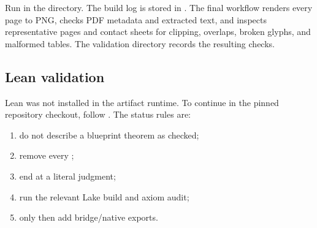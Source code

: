 Run  in the  directory.  The build log is stored
in .  The final workflow renders every page
to PNG, checks PDF metadata and extracted text, and inspects representative
pages and contact sheets for clipping, overlaps, broken glyphs, and malformed
tables.  The validation directory records the resulting checks.

\subsection{Lean validation}

Lean was not installed in the artifact runtime.  To continue in the pinned
repository checkout, follow .  The status
rules are:

\begin{enumerate}
\item do not describe a blueprint theorem as checked;
\item remove every ;
\item end at a literal  judgment;
\item run the relevant Lake build and axiom audit;
\item only then add bridge/native exports.
\end{enumerate}
